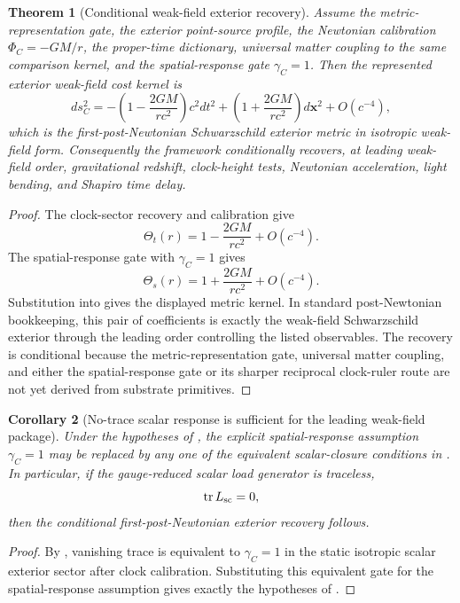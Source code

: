 \documentclass[11pt]{article}
\newtheorem{theorem}{Theorem}[section]
\newtheorem{corollary}[theorem]{Corollary}
\theoremstyle{remark}
\begin{document}
\begin{theorem}[Conditional weak-field exterior recovery]
\label{thm:conditional-weak-field}
Assume the metric-representation gate, the exterior point-source profile, the Newtonian calibration \(\Phi_C=-GM/r\), the proper-time dictionary, universal matter coupling to the same comparison kernel, and the spatial-response gate \(\gamma_C=1\).  Then the represented exterior weak-field cost kernel is
\[
        ds_C^2
        =-\left(1-\frac{2GM}{rc^2}\right)c^2dt^2
        +\left(1+\frac{2GM}{rc^2}\right)d\mathbf x^2
        +O(c^{-4}),
\]
which is the first-post-Newtonian Schwarzschild exterior metric in isotropic weak-field form.  Consequently the framework conditionally recovers, at leading weak-field order, gravitational redshift, clock-height tests, Newtonian acceleration, light bending, and Shapiro time delay.
\end{theorem}

\begin{proof}
The clock-sector recovery and calibration give
\[
        \Theta_t(r)=1-\frac{2GM}{rc^2}+O(c^{-4}).
\]
The spatial-response gate with \(\gamma_C=1\) gives
\[
        \Theta_s(r)=1+\frac{2GM}{rc^2}+O(c^{-4}).
\]
Substitution into  gives the displayed metric kernel.  In standard post-Newtonian bookkeeping, this pair of coefficients is exactly the weak-field Schwarzschild exterior through the leading order controlling the listed observables.  The recovery is conditional because the metric-representation gate, universal matter coupling, and either the spatial-response gate or its sharper reciprocal clock-ruler route are not yet derived from substrate primitives.
\end{proof}


\begin{corollary}[No-trace scalar response is sufficient for the leading weak-field package]
\label{cor:no-trace-suffices-weak-field}
Under the hypotheses of , the explicit spatial-response assumption \(\gamma_C=1\) may be replaced by any one of the equivalent scalar-closure conditions in .  In particular, if the gauge-reduced scalar load generator is traceless,
\[
        \operatorname{tr}L_{\rm sc}=0,
\]
then the conditional first-post-Newtonian exterior recovery follows.
\end{corollary}

\begin{proof}
By , vanishing trace is equivalent to \(\gamma_C=1\) in the static isotropic scalar exterior sector after clock calibration.  Substituting this equivalent gate for the spatial-response assumption gives exactly the hypotheses of .
\end{proof}
\end{document}
